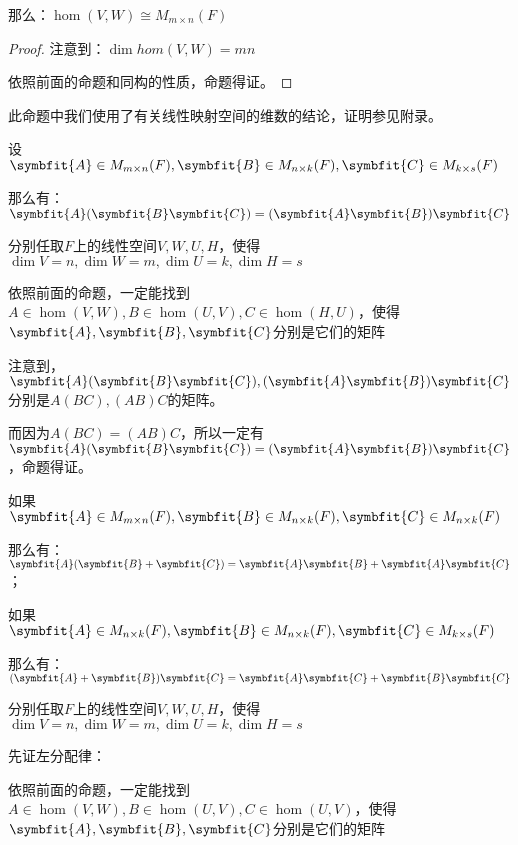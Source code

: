 \documentclass[12pt, a4paper, oneside, UTF8]{ctexbook}
\begin{document}
\begin{para}{0}
\begin{proposition}
						那么：$\hom(V,W) \cong M_{m \times n}(F)$
					\end{proposition}
					\begin{proof}
						注意到：$\dim hom(V,W)=mn$

						依照前面的命题和同构的性质，命题得证。
					\end{proof}
					此命题中我们使用了有关线性映射空间的维数的结论，证明参见附录。
					\begin{proposition}
						设$\symbfit{A} \in M_{m \times n}(F),\symbfit{B} \in M_{n \times k}(F),\symbfit{C} \in M_{k \times s}(F)$

						那么有：$\symbfit{A}(\symbfit{B}\symbfit{C})=(\symbfit{A}\symbfit{B})\symbfit{C}$
					\end{proposition}
					\begin{proposition}
						分别任取$F$上的线性空间$V,W,U,H$，使得$\dim V = n,\dim W=m,\dim U = k ,\dim H = s$

						依照前面的命题，一定能找到$A \in \hom(V,W),B \in \hom(U,V),C \in \hom(H,U)$，使得$\symbfit{A},\symbfit{B},\symbfit{C}$分别是它们的矩阵

						注意到，$\symbfit{A}(\symbfit{B}\symbfit{C}),(\symbfit{A}\symbfit{B})\symbfit{C}$分别是$A(BC),(AB)C$的矩阵。
						
						而因为$A(BC)=(AB)C$，所以一定有$\symbfit{A}(\symbfit{B}\symbfit{C})=(\symbfit{A}\symbfit{B})\symbfit{C}$，命题得证。
					\end{proposition}
					\begin{proposition}
						如果$\symbfit{A} \in M_{m \times n}(F),\symbfit{B} \in M_{n \times k}(F),\symbfit{C} \in M_{n \times k}(F)$

						那么有：$\symbfit{A}(\symbfit{B}+\symbfit{C})=\symbfit{A}\symbfit{B}+\symbfit{A}\symbfit{C}$；

						如果$\symbfit{A} \in M_{n \times k}(F),\symbfit{B} \in M_{n \times k}(F),\symbfit{C} \in M_{k \times s}(F)$

						那么有：$(\symbfit{A}+\symbfit{B})\symbfit{C}=\symbfit{A}\symbfit{C}+\symbfit{B}\symbfit{C}$
					\end{proposition}
					\begin{proposition}
						分别任取$F$上的线性空间$V,W,U,H$，使得$\dim V = n,\dim W=m,\dim U = k ,\dim H = s$

						先证左分配律：
						
						依照前面的命题，一定能找到$A \in \hom(V,W),B \in \hom(U,V),C \in \hom(U,V)$，使得$\symbfit{A},\symbfit{B},\symbfit{C}$分别是它们的矩阵


\end{proposition}
\end{para}
\end{document}
